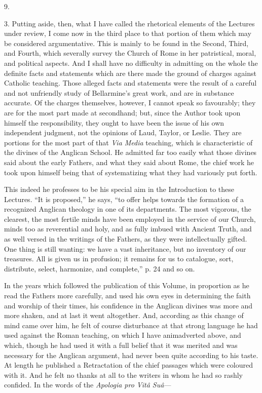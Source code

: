9.

3. Putting aside, then, what I have called the rhetorical elements
of the Lectures under review, I come now in the third place to that
portion of them which may be considered argumentative. This is mainly
to be found in the Second, Third, and Fourth, which severally survey
the Church of Rome in her patristical, moral, and political aspects.
And I shall have no difficulty in admitting on the whole the definite
facts and statements which are there made the ground of charges
against Catholic teaching. Those alleged facts and statements were the
result of a careful and not unfriendly study of Bellarmine's great
work, and are in substance accurate. Of the charges themselves,
however, I cannot speak so favourably; they are for the most part made
at secondhand; but, since the Author took upon himself the
responsibility, they ought to have been the issue of his own
independent judgment, not the opinions of Laud, Taylor, or Leslie.
They are portions for the most part of that \emph{Via Media} teaching,
which is characteristic of the divines of the Anglican
School. He admitted far too easily what those divines said about the
early Fathers, and what they said about Rome, the chief work he took
upon himself being that of systematizing what they had variously put
forth.

This indeed he professes to be his special aim in the Introduction
to these Lectures. ``It is proposed,'' he says, ``to offer
helps towards the formation of a recognized Anglican theology in one
of its departments. The most vigorous, the clearest, the most fertile
minds have been employed in the service of our Church, minds too as
reverential and holy, and as fully imbued with Ancient Truth, and as
well versed in the writings of the Fathers, as they were
intellectually gifted. One thing is still wanting: we have a vast
inheritance, but no inventory of our treasures. All is given us in
profusion; it remains for us to catalogue, sort, distribute, select,
harmonize, and complete,'' p. 24 and so on.

In the years which followed the publication of this Volume, in
proportion as he read the Fathers more carefully, and used his own
eyes in determining the faith and worship of their times, his
confidence in the Anglican divines was more and more shaken, and at
last it went altogether. And, according as this change of mind came
over him, he felt of course disturbance at that strong language he had
used against the Roman teaching, on which I have animadverted
above, and which, though he had used it with a full belief that it was
merited and was necessary for the Anglican argument, had never been
quite according to his taste. At length he published a Retractation of
the chief passages which were coloured with it. And he felt no thanks
at all to the writers in whom he had so rashly confided. In the words
of the \emph{Apologia pro Vitâ Suâ}—

